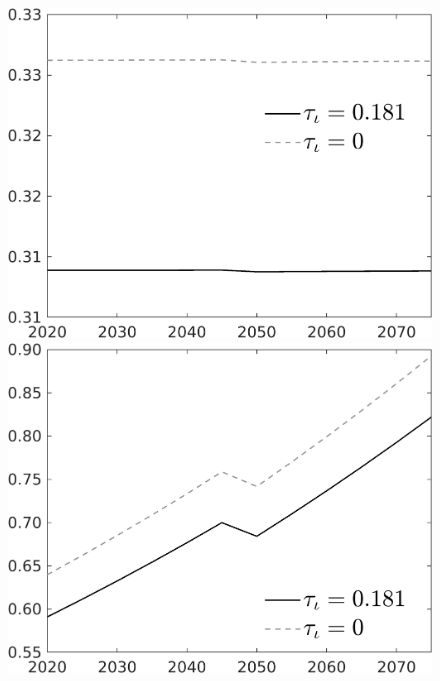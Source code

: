 \documentclass[12pt]{article}
\begin{document}
\begin{figure}[h!!]
\begin{minipage}[]{0.32\textwidth}
	\end{minipage}	
	\begin{minipage}[]{0.32\textwidth}
		\includegraphics[width=1\textwidth]{../../codding_model/own_basedOnFried/optimalPol_010922_revision/figures/all_13Sept22/CompTauf_bytaul_Reg0_hl_spillover0_nsk0_xgr0_knspil1_sep1_LFlimit1_emsbase0_countec0_GovRev0_etaa0.79_lgd1.png}
	\end{minipage}	
	\begin{minipage}[]{0.32\textwidth}
		\includegraphics[width=1\textwidth]{../../codding_model/own_basedOnFried/optimalPol_010922_revision/figures/all_13Sept22/CompTauf_bytaul_Reg0_C_spillover0_nsk0_xgr0_knspil1_sep1_LFlimit1_emsbase0_countec0_GovRev0_etaa0.79_lgd1.png}

\end{minipage}
\end{figure}
\end{document}
